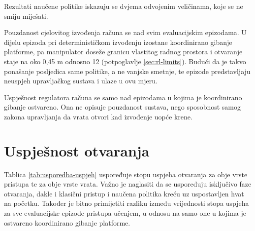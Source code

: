 Rezultati naučene politike iskazuju se dvjema odvojenim veličinama, koje se ne smiju miješati.

Pouzdanost cjelovitog izvođenja računa se nad svim evaluacijskim epizodama. U
dijelu epizoda pri determinističkom izvođenju izostane koordinirano gibanje platforme, pa
manipulator doseže granicu vlastitog radnog prostora i otvaranje staje na oko 0,45 m odnosno
12\textdegree{} (potpoglavlje \ref{sec:rl-limits}). Budući da je takvo ponašanje posljedica same
politike, a ne vanjske smetnje, te epizode predstavljaju neuspjeh upravljačkog sustava i ulaze u
ovu mjeru.

Uspješnost regulatora računa se samo nad epizodama u kojima je koordinirano gibanje
ostvareno. Ona ne opisuje pouzdanost sustava, nego sposobnost samog zakona upravljanja da vrata
otvori kad izvođenje uopće krene.

\section{Uspješnost otvaranja}
\label{sec:usporedba}

Tablica \ref{tab:usporedba-uspjeh} uspoređuje stopu uspjeha otvaranja za obje vrste pristupa
te za obje vrste vrata. Važno je naglasiti da se uspoređuju isključivo faze otvaranja, dakle
i klasični pristup i naučena politika kreću uz uspostavljen hvat na početku. Također je bitno
primijetiti razliku između vrijednosti stopa uspjeha za sve evaluacijske epizode pristupa učenjem,
u odnosu na samo one u kojima je ostvareno koordinirano gibanje platforme.

